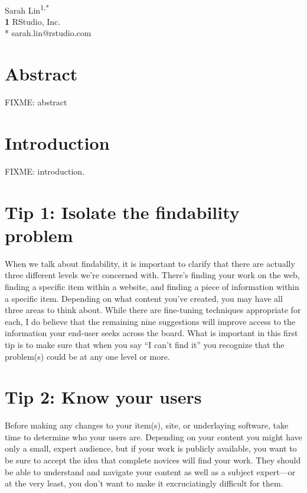 \documentclass[10pt,letterpaper]{article}
\newcommand{\rulemajor}[1]{\section*{#1}}
\begin{document}
\vspace*{0.2in}

\begin{flushleft}
{\Large
\textbf{}
}
\newline
\\
{Sarah Lin}\textsuperscript{1,*}
\\
\textbf{1} RStudio, Inc.
\\
\bigskip
* sarah.lin@rstudio.com
\end{flushleft}

\section*{Abstract}

FIXME: abstract

\section*{Introduction}

FIXME: introduction.

\rulemajor{Tip 1: Isolate the findability problem}

When we talk about findability,
it is important to clarify that there are actually three different levels we're concerned with.
There's finding your work on the web,
finding a specific item within a website,
and finding a piece of information within a specific item.
Depending on what content you've created,
you may have all three areas to think about.
While there are fine-tuning techniques appropriate for each,
I do believe that the remaining nine suggestions will improve access to the information your end-user seeks across the board.
What is important in this first tip is to make sure that when you say ``I can't find it''
you recognize that the problem(s) could be at any one level or more.

\rulemajor{Tip 2: Know your users}

Before making any changes to your item(s), site, or underlaying software,
take time to determine who your users are.
Depending on your content you might have only a small, expert audience,
but if your work is publicly available,
you want to be sure to accept the idea that complete novices will find your work.
They should be able to understand and navigate your content as well as a subject expert---or at the very least,
you don't want to make it excruciatingly difficult for them.
\end{document}

